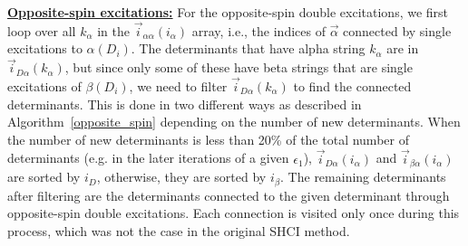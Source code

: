 \documentclass[%
reprint,
 superscriptaddress,
 amsmath,amssymb,
 aps,
]{revtex4-1}
\def\vecD{\vec{D}}
\def\veca{\vec{\alpha}}
\def\vecb{\vec{\beta}}
\def\ia{i_\alpha}
\def\ib{i_\beta}
\def\veciDa{\vec{i}_{D\alpha}}
\def\veciaa{\vec{i}_{\alpha\alpha}}
\def\veciba{\vec{i}_{\beta\alpha}}
\begin{document}
\noindent \underline{\bf Opposite-spin excitations:} For the opposite-spin double excitations, we first loop over all $k_\alpha$ in the $\veciaa(\ia)$ array,
i.e., the indices of $\veca$ connected by single excitations to $\alpha(D_i)$.
The determinants that have alpha string $k_\alpha$ are in $\veciDa(k_\alpha)$, but since only some of these
have beta strings that are single excitations of $\beta(D_i)$, we need to filter $\veciDa(k_\alpha)$
to find the connected determinants.
This is done in two different ways as described in Algorithm~\ref{opposite_spin}
depending on the number of new determinants.
When the number of new determinants is less than 20\% of the total number of determinants (e.g. in the later iterations of a given $\epsilon_1$), $\veciDa(\ia)$ and $\veciba(\ia)$ are sorted by $i_D$, otherwise, they are sorted by $\ib$.
The remaining determinants after filtering are the determinants connected to the given determinant through opposite-spin double excitations.
Each connection is visited only once during this process, which was not the case in the
original SHCI method.

\end{document}
